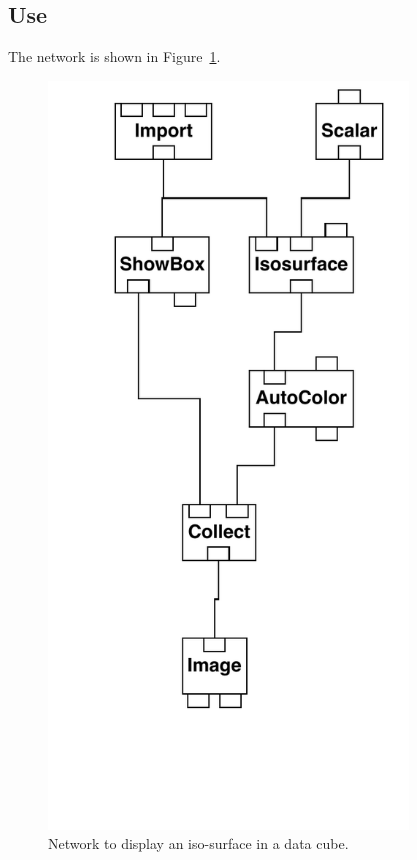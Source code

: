 \documentclass[twoside,11pt]{starlink}
\begin{document}
\subsection{Use}

The network is shown in Figure~\ref{ISOSURFNETF}.

\begin{figure}[htbp]

\begin{center}
\leavevmode
\includegraphics[width=271pt]{sc2_isosurface}
\end{center}

\caption[Network to display an iso-surface in a data cube.]{Network to
display an iso-surface in a data cube. \label{ISOSURFNETF} }

\end{figure}
\end{document}
